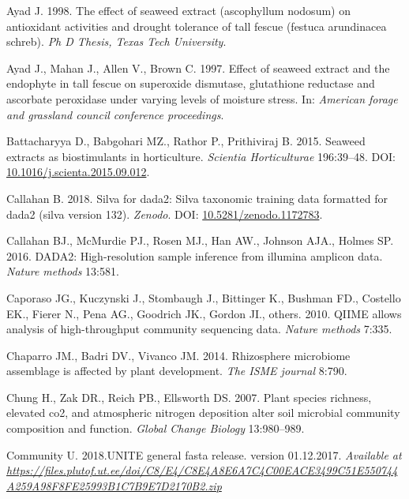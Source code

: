\documentclass[12pt,]{article}
\begin{document}
\hypertarget{ref-ayad1998effect}{}
Ayad J. 1998. The effect of seaweed extract (ascophyllum nodosum) on
antioxidant activities and drought tolerance of tall fescue (festuca
arundinacea schreb). \emph{Ph D Thesis, Texas Tech University}.

\hypertarget{ref-ayad1997effect}{}
Ayad J., Mahan J., Allen V., Brown C. 1997. Effect of seaweed extract
and the endophyte in tall fescue on superoxide dismutase, glutathione
reductase and ascorbate peroxidase under varying levels of moisture
stress. In: \emph{American forage and grassland council conference
proceedings}.

\hypertarget{ref-Battacharyya2015}{}
Battacharyya D., Babgohari MZ., Rathor P., Prithiviraj B. 2015. Seaweed
extracts as biostimulants in horticulture. \emph{Scientia Horticulturae}
196:39--48. DOI:
\href{https://doi.org/10.1016/j.scienta.2015.09.012}{10.1016/j.scienta.2015.09.012}.

\hypertarget{ref-silva}{}
Callahan B. 2018. Silva for dada2: Silva taxonomic training data
formatted for dada2 (silva version 132). \emph{Zenodo}. DOI:
\href{https://doi.org/10.5281/zenodo.1172783}{10.5281/zenodo.1172783}.

\hypertarget{ref-callahan2016dada2}{}
Callahan BJ., McMurdie PJ., Rosen MJ., Han AW., Johnson AJA., Holmes SP.
2016. DADA2: High-resolution sample inference from illumina amplicon
data. \emph{Nature methods} 13:581.

\hypertarget{ref-caporaso2010qiime}{}
Caporaso JG., Kuczynski J., Stombaugh J., Bittinger K., Bushman FD.,
Costello EK., Fierer N., Pena AG., Goodrich JK., Gordon JI., others.
2010. QIIME allows analysis of high-throughput community sequencing
data. \emph{Nature methods} 7:335.

\hypertarget{ref-chaparro2014rhizosphere}{}
Chaparro JM., Badri DV., Vivanco JM. 2014. Rhizosphere microbiome
assemblage is affected by plant development. \emph{The ISME journal}
8:790.

\hypertarget{ref-chung2007plant}{}
Chung H., Zak DR., Reich PB., Ellsworth DS. 2007. Plant species
richness, elevated co2, and atmospheric nitrogen deposition alter soil
microbial community composition and function. \emph{Global Change
Biology} 13:980--989.

\hypertarget{ref-UNITE2017}{}
Community U. 2018.UNITE general fasta release. version 01.12.2017.
\emph{Available at}
\emph{\url{https://files.plutof.ut.ee/doi/C8/E4/C8E4A8E6A7C4C00EACE3499C51E550744A259A98F8FE25993B1C7B9E7D2170B2.zip}}
\end{document}
